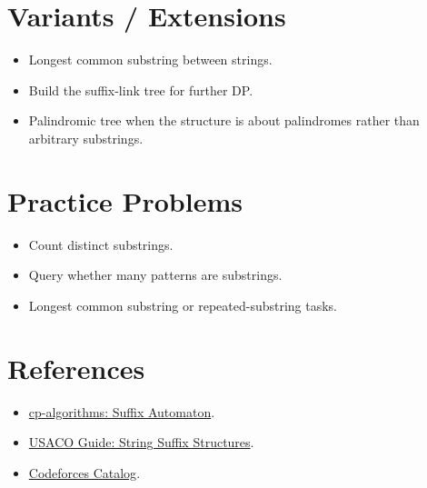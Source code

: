 \section*{Variants / Extensions}

\begin{itemize}
  \item Longest common substring between strings.
  \item Build the suffix-link tree for further DP.
  \item Palindromic tree when the structure is about palindromes rather than arbitrary substrings.
\end{itemize}

\section*{Practice Problems}

\begin{itemize}
  \item Count distinct substrings.
  \item Query whether many patterns are substrings.
  \item Longest common substring or repeated-substring tasks.
\end{itemize}

\section*{References}

\begin{itemize}
  \item \href{https://cp-algorithms.com/string/suffix-automaton.html}{cp-algorithms: Suffix Automaton}.
  \item \href{https://usaco.guide/adv/string-suffix}{USACO Guide: String Suffix Structures}.
  \item \href{https://codeforces.com/catalog?locale=en}{Codeforces Catalog}.
\end{itemize}
